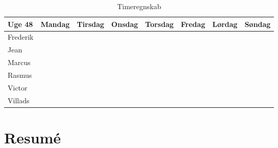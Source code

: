 \begin{table}[H]
\begin{tabular}{@{}lccccccc@{}}
\toprule
Uge 48   & Mandag & Tirsdag & Onsdag & Torsdag & Fredag & Lørdag & Søndag \\ \midrule
Frederik &    &    &    &    &    &    &    \\
Jean     &    &    &    &    &    &    &    \\
Marcus   &    &    &    &    &    &    &    \\
Rasmus   &    &    &    &    &    &    &    \\
Victor   &    &    &    &    &    &    &    \\
Villads  &    &    &    &    &    &    &    \\ \bottomrule
\end{tabular}
\caption{Timeregnskab}
\end {table}

\clearpage


\section*{Resumé}
\lipsum[3]